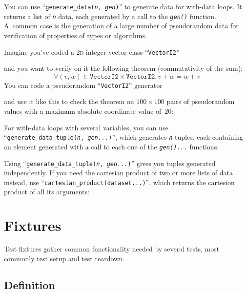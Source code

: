 \documentclass[twoside, a4paper, article]{memoir}
\providecommand\typesetexample[1]{%
}
\begin{document}
You can use ``\texttt{generate\_data(\textit{n}, \textit{gen})}'' to generate
data for with-data loops.  It returns a list of \texttt{\textit{n}} data, each
generated by a call to the \texttt{\textit{gen()}} function.  A~common case is
the generation of a large number of pseudorandom data for verification of
properties of types or algorithms.

Imagine you've coded a \textsc{2d} integer vector class ``\texttt{VectorI2}''
\typesetexample{data-for-with-data-vector}
and you want to verify on it the following theorem (commutativity of the sum):
\begin{equation}
  \label{eq:1}
  \forall (v, w) \in \texttt{VectorI2} \times \texttt{VectorI2}, v + w = w + v
\end{equation}
You can code a pseudorandom ``\texttt{VectorI2}'' generator
\typesetexample{data-for-with-data-generator}
and use it like this to check the theorem on $100 \times 100$ pairs of
pseudorandom values with a maximum absolute coordinate value of~$20$:

\typesetexample{data-for-with-data-loop}

For with-data loops with several variables, you can use
``\texttt{generate\_data\_tuple(\textit{n}, \textit{gen...})}'', which
generates \texttt{\textit{n}} tuples, each containing an element generated with
a call to each one of the \texttt{\textit{gen()...}} functions:

\typesetexample{data-for-with-data-generate-data-tuple}

Using ``\texttt{generate\_data\_tuple(\textit{n}, \textit{gen...})}'' gives you
tuples generated independently.  If you need the cartesian product of two or
more lists of data instead, use ``\texttt{cartesian\_product(dataset...)}'',
which returns the cartesion product of all its arguments:

\typesetexample{data-for-with-data-cartesian-product}


\chapter{Fixtures}
\label{cha:fixtures}

Test fixtures gather common functionality needed by several tests, most
commonly test setup and test teardown.

\section{Definition}
\label{sec:fixture-definition}
\end{document}
